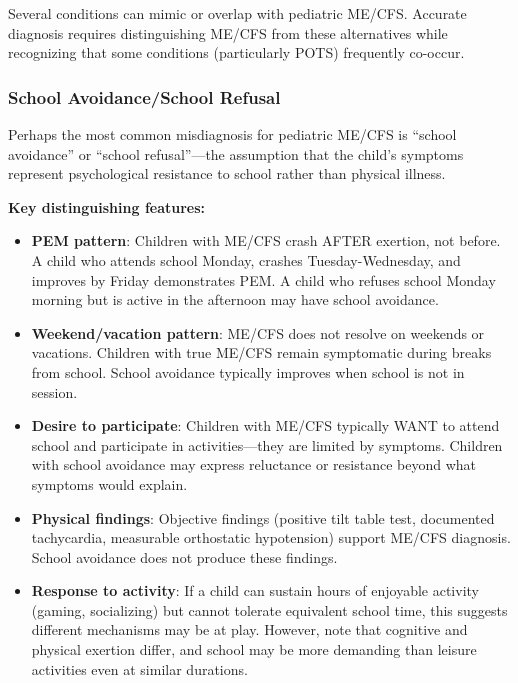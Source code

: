 Several conditions can mimic or overlap with pediatric ME/CFS. Accurate diagnosis requires distinguishing ME/CFS from these alternatives while recognizing that some conditions (particularly POTS) frequently co-occur.

\subsubsection{School Avoidance/School Refusal}

Perhaps the most common misdiagnosis for pediatric ME/CFS is ``school avoidance'' or ``school refusal''---the assumption that the child's symptoms represent psychological resistance to school rather than physical illness.

\textbf{Key distinguishing features:}

\begin{itemize}
    \item \textbf{PEM pattern}: Children with ME/CFS crash AFTER exertion, not before. A child who attends school Monday, crashes Tuesday-Wednesday, and improves by Friday demonstrates PEM. A child who refuses school Monday morning but is active in the afternoon may have school avoidance.

    \item \textbf{Weekend/vacation pattern}: ME/CFS does not resolve on weekends or vacations. Children with true ME/CFS remain symptomatic during breaks from school. School avoidance typically improves when school is not in session.

    \item \textbf{Desire to participate}: Children with ME/CFS typically WANT to attend school and participate in activities---they are limited by symptoms. Children with school avoidance may express reluctance or resistance beyond what symptoms would explain.

    \item \textbf{Physical findings}: Objective findings (positive tilt table test, documented tachycardia, measurable orthostatic hypotension) support ME/CFS diagnosis. School avoidance does not produce these findings.

    \item \textbf{Response to activity}: If a child can sustain hours of enjoyable activity (gaming, socializing) but cannot tolerate equivalent school time, this suggests different mechanisms may be at play. However, note that cognitive and physical exertion differ, and school may be more demanding than leisure activities even at similar durations.
\end{itemize}


